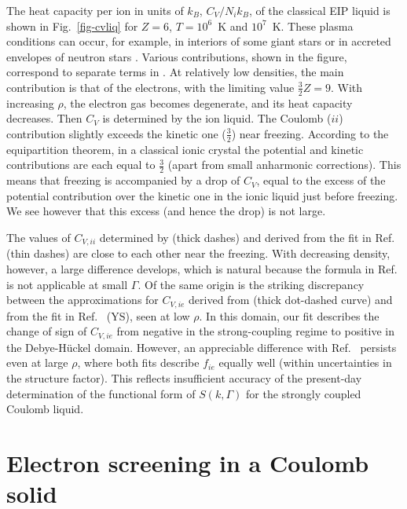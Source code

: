 The heat capacity per ion in units of $k_B$, $C_V/N_i k_B$, 
of the classical EIP liquid is shown in Fig.~\ref{fig-cvliq}
for $Z=6$, $T=10^6$~K and $10^7$~K. These plasma conditions can occur,
for example, in interiors of some giant stars
or in accreted envelopes of neutron stars \cite{PCY}.
Various contributions, shown in the figure,
correspond to separate terms in .
At relatively low densities, the main contribution is that of the electrons,
with the limiting value $\frac32Z=9$.
With increasing $\rho$, the electron gas becomes degenerate,
and its heat capacity decreases.
Then $C_V$ is determined by the ion liquid.
The Coulomb ($ii$) contribution slightly
exceeds the kinetic one ($\frac32$) near freezing.
According to the equipartition theorem,
in a classical ionic crystal the potential 
and kinetic contributions are each equal to $\frac32$ 
(apart from small anharmonic corrections).
This means that freezing is accompanied by a drop
of $C_V$, equal to the excess of the potential
contribution over the kinetic one in the ionic 
liquid just before freezing.
We see however that this excess (and hence the drop)
is not large.

The values of $C_{V,ii}$ determined by  (thick dashes)
and derived from the fit in Ref.\cite{DWS} (thin dashes)
are close to each other near the freezing. With decreasing density, however,
a large difference develops, which is natural because
the formula in Ref.\cite{DWS} is not applicable at small $\Gamma$.
Of the same origin is the striking discrepancy
between the approximations
for $C_{V,ie}$ derived from  (thick dot-dashed curve)
and from the fit in Ref.~\cite{YS} (YS), seen at low $\rho$.
In this domain, our fit describes the change
of sign of  $C_{V,ie}$ from negative in the strong-coupling
regime to positive in the Debye-H\"uckel domain.
However, an appreciable difference with Ref.~\cite{YS}
persists even at large $\rho$, where both fits
describe $f_{ie}$ equally 
well (within uncertainties in the structure factor).
This reflects insufficient accuracy
of the present-day determination of the functional form
of $S(k,\Gamma)$ for the strongly coupled Coulomb liquid.

\section{Electron screening in a Coulomb solid}
\label{sect-ie-solid}
